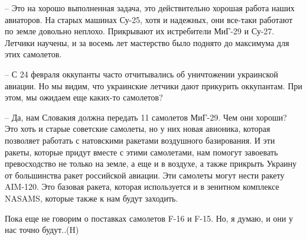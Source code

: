 – Это на хорошо выполненная задача, это действительно хорошая работа наших
авиаторов. На старых машинах Су-25, хотя и надежных, они все-таки работают по
земле довольно неплохо. Прикрывают их истребители МиГ-29 и Су-27. Летчики
научены, и за восемь лет мастерство было поднято до максимума для этих
самолетов.

– С 24 февраля оккупанты часто отчитывались об уничтожении украинской авиации.
Но мы видим, что украинские летчики дают прикурить оккупантам. При этом, мы
ожидаем еще каких-то самолетов?

– Да, нам Словакия должна передать 11 самолетов МиГ-29. Чем они хороши? Это
хоть и старые советские самолеты, но у них новая авионика, которая позволяет
работать с натовскими ракетами воздушного базирования. И эти ракеты, которые
придут вместе с этими самолетами, нам помогут завоевать превосходство не только
на земле, а еще и в воздухе, а также прикрыть Украину от большинства ракет
российской авиации. Эти самолеты могут нести ракету AIM-120. Это базовая
ракета, которая используется и в зенитном комплексе NASAMS, которые также к нам
будут заходить.

Пока еще не говорим о поставках самолетов F-16 и F-15. Но, я думаю, и они у нас
точно будут..(H)
